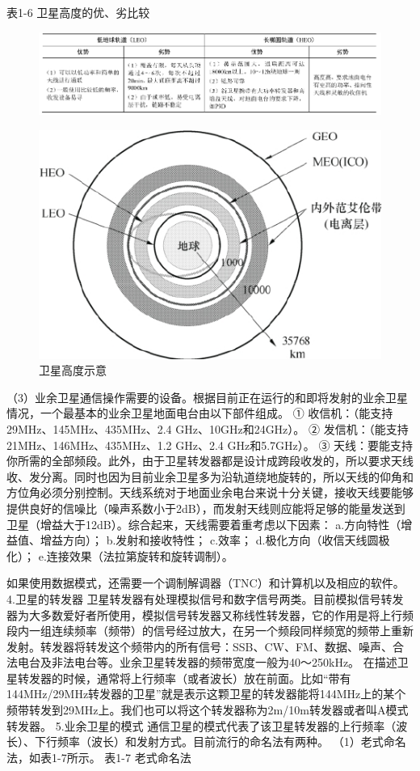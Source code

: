 \documentclass[12pt,UTF8]{ctexbook}
\begin{document}
表1-6 卫星高度的优、劣比较

\begin{figure}[htbp]
	\centering
	\includegraphics[width=0.7\linewidth]{87}
	\caption{}
	\label{fig:1}
\end{figure}

\begin{figure}[htbp]
	\centering
	\includegraphics[width=0.7\linewidth]{88}
	\caption{卫星高度示意}
	\label{fig:1}
\end{figure}

（3）业余卫星通信操作需要的设备。根据目前正在运行的和即将发射的业余卫星情况，一个最基本的业余卫星地面电台由以下部件组成。
① 收信机：（能支持29MHz、145MHz、435MHz、2.4 GHz、10GHz和24GHz）。
② 发信机：（能支持21MHz、146MHz、435MHz、1.2 GHz、2.4 GHz和5.7GHz）。
③ 天线：要能支持你所需的全部频段。此外，由于卫星转发器都是设计成跨段收发的，所以要求天线收、发分离。同时也因为目前业余卫星多为沿轨道绕地旋转的，所以天线的仰角和方位角必须分别控制。天线系统对于地面业余电台来说十分关键，接收天线要能够提供良好的信噪比（噪声系数小于2dB），而发射天线则应能将足够的能量发送到卫星（增益大于12dB）。综合起来，天线需要着重考虑以下因素：
a.方向特性（增益值、增益方向）；
b.发射和接收特性；
c.效率；
d.极化方向（收信天线圆极化）；
e.连接效果（法拉第旋转和旋转调制）。

如果使用数据模式，还需要一个调制解调器（TNC）和计算机以及相应的软件。
4.卫星的转发器
卫星转发器有处理模拟信号和数字信号两类。目前模拟信号转发器为大多数爱好者所使用，模拟信号转发器又称线性转发器，它的作用是将上行频段内一组连续频率（频带）的信号经过放大，在另一个频段同样频宽的频带上重新发射。转发器将转发这个频带内的所有信号：SSB、CW、FM、数据、噪声、合法电台及非法电台等。业余卫星转发器的频带宽度一般为40～250kHz。
在描述卫星转发器的时候，通常将上行频率（或者波长）放在前面。比如“带有144MHz/29MHz转发器的卫星”就是表示这颗卫星的转发器能将144MHz上的某个频带转发到29MHz上。我们也可以将这个转发器称为2m/10m转发器或者叫A模式转发器。
5.业余卫星的模式
通信卫星的模式代表了该卫星转发器的上行频率（波长）、下行频率（波长）和发射方式。目前流行的命名法有两种。
（1）老式命名法，如表1-7所示。
表1-7 老式命名法
\end{document}
